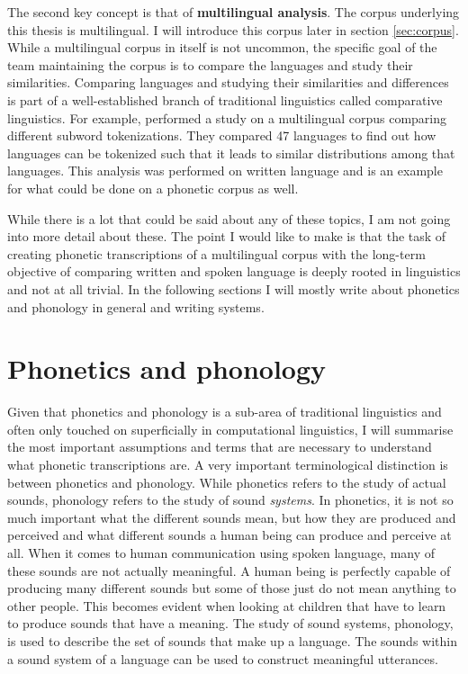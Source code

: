 The second key concept is that of \textbf{multilingual analysis}. The corpus underlying this thesis is multilingual. I will introduce this corpus later in section \ref{sec:corpus}. While a multilingual corpus in itself is not uncommon, the specific goal of the team maintaining the corpus is to compare the languages and study their similarities. Comparing languages and studying their similarities and differences is part of a well-established branch of traditional linguistics called comparative linguistics. For example, \citet{gutierrez-vasques-etal-2021-characters} performed a study on a multilingual corpus comparing different subword tokenizations. They compared 47 languages to find out how languages can be tokenized such that it leads to similar distributions among that languages. This analysis was performed on written language and is an example for what could be done on a phonetic corpus as well.

While there is a lot that could be said about any of these topics, I am not going into more detail about these. The point I would like to make is that the task of creating phonetic transcriptions of a multilingual corpus with the long-term objective of comparing written and spoken language is deeply rooted in linguistics and not at all trivial. In the following sections I will mostly write about phonetics and phonology in general and writing systems.

\section{Phonetics and phonology}
\label{phonetics}
Given that phonetics and phonology is a sub-area of traditional linguistics and often only touched on superficially in computational linguistics, I will summarise the most important assumptions and terms that are necessary to understand what phonetic transcriptions are.
A very important terminological distinction is between phonetics and phonology. While phonetics refers to the study of actual sounds, phonology refers to the study of sound \textit{systems}. In phonetics, it is not so much important what the different sounds mean, but how they are produced and perceived and what different sounds a human being can produce and perceive at all. When it comes to human communication using spoken language, many of these sounds are not actually meaningful. A human being is perfectly capable of producing many different sounds but some of those just do not mean anything to other people. This becomes evident when looking at children that have to learn to produce sounds that have a meaning. The study of sound systems, phonology, is used to describe the set of sounds that make up a language. The sounds within a sound system of a language can be used to construct meaningful utterances. 

